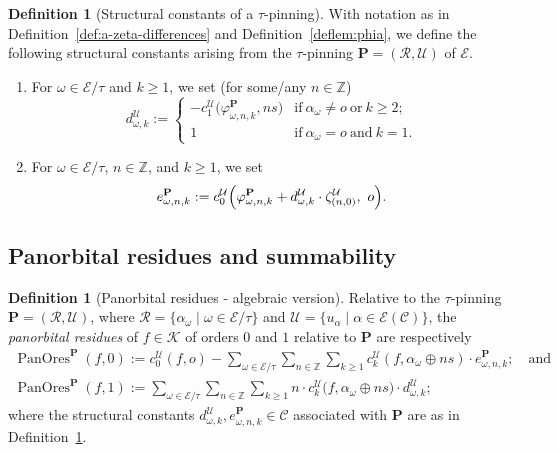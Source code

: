 \documentclass[preprint,12pt]{elsarticle}
\numberwithin{equation}{section} %
\theoremstyle{theorem}
\theoremstyle{definition}
\newtheorem{definition}[theorem]{Definition}
\newcommand{\Ca}{\mathcal{C}} %
\newcommand{\bk}{\mathcal{K}} %
\newcommand{\bke}{{\bk}} %
\newcommand{\ec}{\mathcal{E}} %
\newcommand{\idec}{{o}} %
\newcommand{\orbita}{{\ec/\tau}} %
\newcommand{\Z}{\mathbb{Z}} %
\newcommand{\za}[2]{\zeta^{\mathcal{U}}_{( {#1} , {#2} )}}
\DeclareMathOperator{\pano}{PanOres}
\begin{document}
\begin{definition}[Structural constants of a $\tau$-pinning] \label{def:structural-constants}
    With notation as in Definition~\ref{def:a-zeta-differences} and Definition~\ref{deflem:phia}, we define the following structural constants arising from the $\tau$-pinning $\mathbf{P}=(\mathcal{R},\mathcal{U})$ of $\ec$.
     \begin{enumerate}
        \item For $\omega\in\orbita$ and $k\geq 1$, we set (for some/any $n\in\Z$) \[d_{\omega,k}^{\mathcal{U}}:=\begin{cases}
        -c_1^\mathcal{U}\bigl(\varphi^\mathbf{P}_{\omega,n,k},ns\bigr) & \text{if} \ \alpha_{\omega}\neq\idec \ \text{or} \ k\geq 2;\\
            1 & \text{if} \ \alpha_{\omega}=\idec \ \text{and} \ k=1.
        \end{cases}\]
        \item For $\omega\in\orbita$, $n\in \Z$, and $k\geq 1$, we set \[e^\mathbf{P}_{\omega,n,k}:=c_0^\mathcal{U}\Bigl(\varphi^\mathbf{P}_{\omega,n,k} + d^\mathcal{U}_{\omega,k}\cdot\za{n}{0},\ \idec\Bigr).\]
    \end{enumerate}
\end{definition}

\subsection{Panorbital residues and summability}

\begin{definition}[Panorbital residues - algebraic version]\label{def:pano-a} Relative to the $\tau$-pinning $\mathbf{P}=(\mathcal{R},\mathcal{U})$, where $\mathcal{R}=\{\alpha_{\omega}\mid \omega\in\orbita\}$ and $\mathcal{U}=\{u_\alpha\mid \alpha\in \ec(\Ca)\}$, the \emph{panorbital residues} of $f\in\bke$ of orders $0$ and $1$ relative to $\mathbf{P}$ are respectively
\begin{equation}\label{eq:pano-a-def}
    \begin{gathered}
        \pano^{\mathbf{P}}(f,0):=c_0^\mathcal{U}(f,\idec)-\sum_{\omega\in\orbita}\sum\limits_{n\in\mathbb{Z}}\sum_{k\geq 1}c_k^\mathcal{U}(f,\alpha_{\omega}\oplus ns)\cdot e^\mathbf{P}_{\omega,n,k};\quad \text{and}\\
    \pano^{\mathbf{P}}(f,1):=\sum_{\omega\in\orbita}\sum_{n\in\mathbb{Z}} \sum_{k\geq 1} n\cdot c_k^{\mathcal{U}}\bigl(f,\alpha_{\omega}\oplus ns)\cdot d_{\omega,k}^{\mathcal{U}};
    \end{gathered}
\end{equation} where the structural constants $d^\mathcal{U}_{\omega,k},e^\mathbf{P}_{\omega,n,k}\in\Ca$ associated with $\mathbf{P}$ are as in Definition~\ref{def:structural-constants}.
\end{definition}
\end{document}
